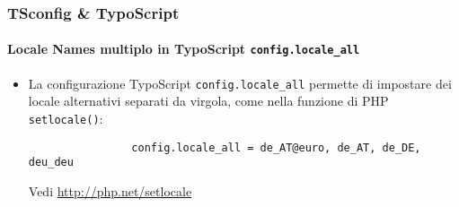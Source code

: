 \begin{frame}[fragile]
	\frametitle{TSconfig \& TypoScript}
	\framesubtitle{Locale Names multiplo in TypoScript \texttt{config.locale\_all}}

	\lstset{basicstyle=\small\ttfamily}

	\begin{itemize}

		\item La configurazione TypoScript \texttt{config.locale\_all} permette di impostare
			dei locale alternativi separati da virgola, come nella funzione di
			PHP \texttt{setlocale()}:

			\begin{lstlisting}
				config.locale_all = de_AT@euro, de_AT, de_DE, deu_deu
			\end{lstlisting}

			Vedi \url{http://php.net/setlocale}

	\end{itemize}

\end{frame}


